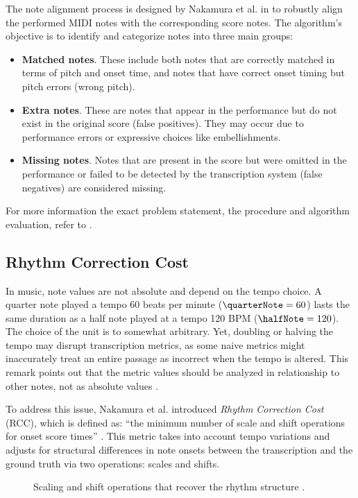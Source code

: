 The note alignment process is designed by Nakamura et al. in \cite{Nakamura2017b} to robustly align the performed MIDI notes with the corresponding score notes. The algorithm's objective is to identify and categorize notes into three main groups: \begin{itemize}
	\item {\bf Matched notes}. These include both notes that are correctly matched in terms of pitch and onset time, and notes that have correct onset timing but pitch errors (wrong pitch).
	\item {\bf Extra notes}. These are notes that appear in the performance but do not exist in the original score (false positives). They may occur due to performance errors or expressive choices like embellishments.
	\item {\bf Missing notes}. Notes that are present in the score but were omitted in the performance or failed to be detected by the transcription system (false negatives) are considered missing.
\end{itemize}

For more information the exact problem statement, the procedure and algorithm evaluation, refer to \cite{Nakamura2017b}.

\subsection{Rhythm Correction Cost}

In music, note values are not absolute and depend on the tempo choice. A quarter note played a tempo $60$ beats per minute ($\quarterNote = 60$) lasts the same duration as a half note played at a tempo 120 BPM ($\halfNote = 120$). The choice of the unit is to somewhat arbitrary. Yet, doubling or halving the tempo may disrupt transcription metrics, as some naive metrics might inaccurately treat an entire passage as incorrect when the tempo is altered. This remark points out that the metric values should be analyzed in relationship to other notes, not as absolute values \cite[p. 7]{Nakamura2017c}.

To address this issue, Nakamura et al. introduced \emph{Rhythm Correction Cost} (RCC), which is defined as: ``the minimum number of scale and shift operations for onset score times'' \cite{Nakamura2018}. This metric takes into account tempo variations and adjusts for structural differences in note onsets between the transcription and the ground truth via two operations: scales and shifts.

\begin{figure}[ht!]
\centering

\caption[Scaling and shift operations that recover the rhythm structure.]{Scaling and shift operations that recover the rhythm structure \cite{Nakamura2017b}.}
\label{rhythm_correction}
\end{figure}

